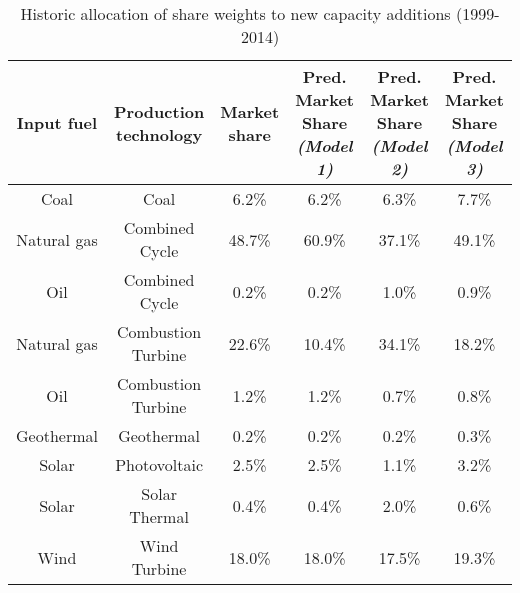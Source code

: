 \documentclass[10pt]{amsart}
\begin{document}
\begin{table}[H]
\caption{Historic allocation of share weights to new capacity additions (1999-2014)}
\centering
\begin{tabular}{c c c c c c}
\hline
\hline
Input fuel & Production technology & Market share & \makecell{Pred. Market Share \\ {\footnotesize\textit{(Model 1)}}} & \makecell{Pred. Market Share \\ {\footnotesize\textit{(Model 2)}}} & \makecell{Pred. Market Share \\ {\footnotesize\textit{(Model 3)}}} \\ [0.5ex]
\hline
Coal & Coal & 6.2\% & 6.2\% &6.3\% &7.7\% \\
Natural gas & Combined Cycle & 48.7\% & 60.9\% & 37.1\% & 49.1\% \\
Oil & Combined Cycle & 0.2\% & 0.2\% & 1.0\% & 0.9\% \\
Natural gas & Combustion Turbine & 22.6\% & 10.4\% & 34.1\% & 18.2\%\\
Oil & Combustion Turbine & 1.2\% & 1.2\% & 0.7\% & 0.8\% \\
Geothermal & Geothermal & 0.2\% & 0.2\% & 0.2\% & 0.3\% \\
Solar & Photovoltaic & 2.5\% & 2.5\% & 1.1\% & 3.2\%\\
Solar & Solar Thermal & 0.4\% & 0.4\% & 2.0\% & 0.6\%\\
Wind & Wind Turbine & 18.0\% & 18.0\% & 17.5\% & 19.3\% \\ [1ex]
\hline
\end{tabular}
\label{table:perc}
\end{table}
\end{document}

